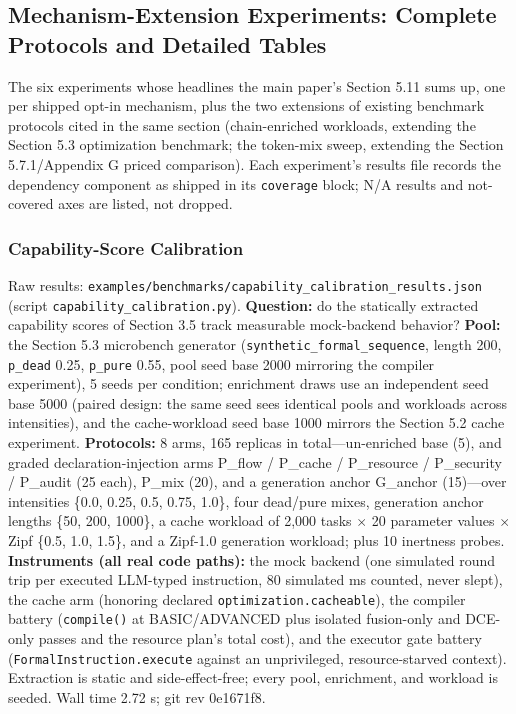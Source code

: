 \documentclass[
  11pt,
]{article}
\begin{document}
\subsection{Mechanism-Extension Experiments: Complete Protocols and
Detailed
Tables}\label{mechanism-extension-experiments-complete-protocols-and-detailed-tables}

The six experiments whose headlines the main paper's Section 5.11 sums
up, one per shipped opt-in mechanism, plus the two extensions of
existing benchmark protocols cited in the same section (chain-enriched
workloads, extending the Section 5.3 optimization benchmark; the
token-mix sweep, extending the Section 5.7.1/Appendix G priced
comparison). Each experiment's results file records the dependency
component as shipped in its \texttt{coverage} block; N/A results and
not-covered axes are listed, not dropped.

\subsubsection{Capability-Score
Calibration}\label{capability-score-calibration}

Raw results:
\texttt{examples/benchmarks/capability\_calibration\_results.json}
(script \texttt{capability\_calibration.py}). \textbf{Question:} do the
statically extracted capability scores of Section 3.5 track measurable
mock-backend behavior? \textbf{Pool:} the Section 5.3 microbench
generator (\texttt{synthetic\_formal\_sequence}, length 200,
\texttt{p\_dead} 0.25, \texttt{p\_pure} 0.55, pool seed base 2000
mirroring the compiler experiment), 5 seeds per condition; enrichment
draws use an independent seed base 5000 (paired design: the same seed
sees identical pools and workloads across intensities), and the
cache-workload seed base 1000 mirrors the Section 5.2 cache experiment.
\textbf{Protocols:} 8 arms, 165 replicas in total---un-enriched base
(5), and graded declaration-injection arms P\_flow / P\_cache /
P\_resource / P\_security / P\_audit (25 each), P\_mix (20), and a
generation anchor G\_anchor (15)---over intensities \{0.0, 0.25, 0.5,
0.75, 1.0\}, four dead/pure mixes, generation anchor lengths \{50, 200,
1000\}, a cache workload of 2,000 tasks \(\times\) 20 parameter values
\(\times\) Zipf \{0.5, 1.0, 1.5\}, and a Zipf-1.0 generation workload;
plus 10 inertness probes. \textbf{Instruments (all real code paths):}
the mock backend (one simulated round trip per executed LLM-typed
instruction, 80 simulated ms counted, never slept), the cache arm
(honoring declared \texttt{optimization.cacheable}), the compiler
battery (\texttt{compile()} at BASIC/ADVANCED plus isolated fusion-only
and DCE-only passes and the resource plan's total cost), and the
executor gate battery (\texttt{FormalInstruction.execute} against an
unprivileged, resource-starved context). Extraction is static and
side-effect-free; every pool, enrichment, and workload is seeded. Wall
time 2.72 s; git rev 0e1671f8.
\end{document}
